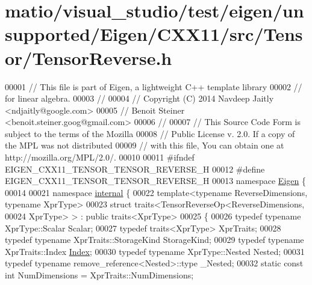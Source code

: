\hypertarget{matio_2visual__studio_2test_2eigen_2unsupported_2_eigen_2_c_x_x11_2src_2_tensor_2_tensor_reverse_8h_source}{}\section{matio/visual\+\_\+studio/test/eigen/unsupported/\+Eigen/\+C\+X\+X11/src/\+Tensor/\+Tensor\+Reverse.h}
\label{matio_2visual__studio_2test_2eigen_2unsupported_2_eigen_2_c_x_x11_2src_2_tensor_2_tensor_reverse_8h_source}

\begin{DoxyCode}
00001 \textcolor{comment}{// This file is part of Eigen, a lightweight C++ template library}
00002 \textcolor{comment}{// for linear algebra.}
00003 \textcolor{comment}{//}
00004 \textcolor{comment}{// Copyright (C) 2014 Navdeep Jaitly <ndjaitly@google.com>}
00005 \textcolor{comment}{//                    Benoit Steiner <benoit.steiner.goog@gmail.com>}
00006 \textcolor{comment}{//}
00007 \textcolor{comment}{// This Source Code Form is subject to the terms of the Mozilla}
00008 \textcolor{comment}{// Public License v. 2.0. If a copy of the MPL was not distributed}
00009 \textcolor{comment}{// with this file, You can obtain one at http://mozilla.org/MPL/2.0/.}
00010 
00011 \textcolor{preprocessor}{#ifndef EIGEN\_CXX11\_TENSOR\_TENSOR\_REVERSE\_H}
00012 \textcolor{preprocessor}{#define EIGEN\_CXX11\_TENSOR\_TENSOR\_REVERSE\_H}
00013 \textcolor{keyword}{namespace }\hyperlink{namespace_eigen}{Eigen} \{
00014 
00021 \textcolor{keyword}{namespace }\hyperlink{namespaceinternal}{internal} \{
00022 \textcolor{keyword}{template}<\textcolor{keyword}{typename} ReverseDimensions, \textcolor{keyword}{typename} XprType>
00023 \textcolor{keyword}{struct }traits<TensorReverseOp<ReverseDimensions,
00024                               XprType> > : \textcolor{keyword}{public} traits<XprType>
00025 \{
00026   \textcolor{keyword}{typedef} \textcolor{keyword}{typename} XprType::Scalar Scalar;
00027   \textcolor{keyword}{typedef} traits<XprType> XprTraits;
00028   \textcolor{keyword}{typedef} \textcolor{keyword}{typename} XprTraits::StorageKind StorageKind;
00029   \textcolor{keyword}{typedef} \textcolor{keyword}{typename} XprTraits::Index \hyperlink{namespace_eigen_a62e77e0933482dafde8fe197d9a2cfde}{Index};
00030   \textcolor{keyword}{typedef} \textcolor{keyword}{typename} XprType::Nested Nested;
00031   \textcolor{keyword}{typedef} \textcolor{keyword}{typename} remove\_reference<Nested>::type \_Nested;
00032   \textcolor{keyword}{static} \textcolor{keyword}{const} \textcolor{keywordtype}{int} NumDimensions = XprTraits::NumDimensions;

\end{DoxyCode}
